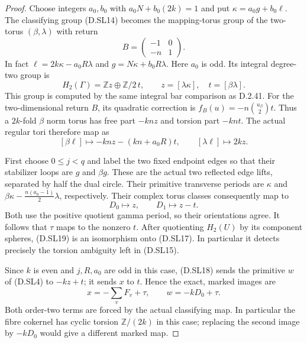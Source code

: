 \begin{proof}
Choose integers $a_0,b_0$ with
$a_0N+b_0(2k)=1$ and put
$\kappa=a_0g+b_0\ell$. The classifying
group (D.SL14) becomes the mapping-torus
group of the two-torus $(\beta,\lambda)$
with return
\[
           B=\begin{pmatrix}-1&0\\-n&1\end{pmatrix}.
\]
In fact
$\ell=2k\kappa-a_0R\lambda$ and
$g=N\kappa+b_0R\lambda$.
Here $a_0$ is odd. Its integral degree-two
group is
\[
 H_2(\Gamma)=\mathbb Zz\oplus\mathbb Z/2\,t,
       \qquad z=[\lambda\kappa],\quad t=[\beta\lambda].
                                                               \tag{D.SL17}
\]
This group is computed by the same integral
bar comparison as D.2.41. For the two-dimensional
return $B$, its quadratic correction is
$f_B(u)=-n\binom{u_\beta}{2}t$.
Thus a $2k$-fold $\beta$ norm torus has
free part $-knz$ and torsion part $-knt$.
The actual regular tori therefore map as
\[
 [\beta\ell]\longmapsto-knz-(kn+a_0R)t,
 \qquad [\lambda\ell]\longmapsto2kz.                     \tag{D.SL18}
\]

First choose $0\le j<q$ and label the two fixed endpoint edges so that
their stabilizer loops are $g$ and $\beta g$.
These are the actual two reflected edge
lifts, separated by half the dual circle.
Their primitive transverse periods are
$\kappa$ and
$\beta\kappa-\frac{n(a_0-1)}2\lambda$, respectively.
Their complex torus classes consequently
map to
\[
                        D_0\mapsto z,\qquad D_1\mapsto z-t.
                                                               \tag{D.SL19}
\]
Both use the positive quotient gamma period,
so their orientations agree. It follows
that $\tau$ maps to the nonzero $t$.
After quotienting $H_2(U)$ by its component
spheres, (D.SL19) is an isomorphism onto
(D.SL17). In particular it detects precisely
the torsion ambiguity left in (D.SL15).

Since $k$ is even and $j,R,a_0$ are odd
in this case, (D.SL18) sends the primitive
$w$ of (D.SL4) to $-kz+t$; it sends $x$
to $t$. Hence the exact, marked images are
\[
       x=-\sum_vF_v+\tau,\qquad
                         w=-kD_0+\tau.                   \tag{D.SL20}
\]
Both order-two terms are forced by the
actual classifying map. In particular the
fibre cokernel has cyclic torsion
$\mathbb Z/(2k)$ in this case; replacing
the second image by $-kD_0$ would give a
different marked map.


\end{proof}
